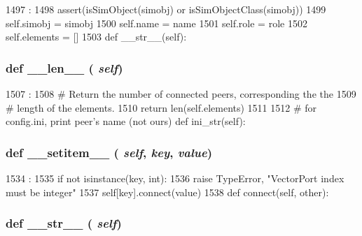 \begin{DoxyCode}
1497                                           :
1498         assert(isSimObject(simobj) or isSimObjectClass(simobj))
1499         self.simobj = simobj
1500         self.name = name
1501         self.role = role
1502         self.elements = []
1503 
    def __str__(self):
\end{DoxyCode}
\hypertarget{classm5_1_1params_1_1VectorPortRef_af6412d48d9a71eac81e3195b52455aaa}{
\subsubsection[{\_\-\_\-len\_\-\_\-}]{\setlength{\rightskip}{0pt plus 5cm}def \_\-\_\-len\_\-\_\- ( {\em self})}}
\label{classm5_1_1params_1_1VectorPortRef_af6412d48d9a71eac81e3195b52455aaa}



\begin{DoxyCode}
1507                      :
1508         # Return the number of connected peers, corresponding the the
1509         # length of the elements.
1510         return len(self.elements)
1511 
1512     # for config.ini, print peer's name (not ours)
    def ini_str(self):
\end{DoxyCode}
\hypertarget{classm5_1_1params_1_1VectorPortRef_a09195b01147e970ca71c48b57f653940}{
\subsubsection[{\_\-\_\-setitem\_\-\_\-}]{\setlength{\rightskip}{0pt plus 5cm}def \_\-\_\-setitem\_\-\_\- ( {\em self}, \/   {\em key}, \/   {\em value})}}
\label{classm5_1_1params_1_1VectorPortRef_a09195b01147e970ca71c48b57f653940}



\begin{DoxyCode}
1534                                      :
1535         if not isinstance(key, int):
1536             raise TypeError, "VectorPort index must be integer"
1537         self[key].connect(value)
1538 
    def connect(self, other):
\end{DoxyCode}
\hypertarget{classm5_1_1params_1_1VectorPortRef_aa7a4b9bc0941308e362738503137460e}{
\subsubsection[{\_\-\_\-str\_\-\_\-}]{\setlength{\rightskip}{0pt plus 5cm}def \_\-\_\-str\_\-\_\- ( {\em self})}}
\label{classm5_1_1params_1_1VectorPortRef_aa7a4b9bc0941308e362738503137460e}



